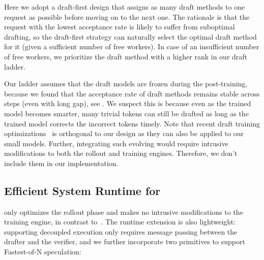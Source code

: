 Here we adopt a draft-first design that assigns as many draft methods to one request as possible before moving on to the next one.
The rationale is that the request with the lowest acceptance rate is likely to suffer from suboptimal drafting,
so the draft-first strategy can naturally select the optimal draft method for it (given a sufficient number of free workers).
In case of an insufficient number of free workers, we prioritize the draft method with a higher rank in our draft ladder.


Our ladder assumes that the draft models are frozen during the post-training, 
because we found that the acceptance rate of draft methods remains stable 
across steps (even with long gap), see {}. 
We suspect this is because even as the trained model becomes smarter,
many trivial tokens can still be drafted as long as the trained model corrects
the incorrect tokens timely. 
{Note that recent draft training optimizations~\cite{tlt} is orthogonal 
to our design as they can also be applied to our small models.}
Further, integrating such evolving would require
intrusive modifications to both the rollout and training engines.
Therefore, we don't include them in our implementation. 

\subsection{Efficient System Runtime for {\sys}}
\label{sec:design-mechanisms}

\noindent 
{\sys} only optimizes the rollout phase and makes no intrusive modifications
to the training engine, in contrast to~\cite{rlhfuse,rollpacker}.
The runtime extension is also lightweight:
supporting decoupled execution only requires message passing
between the drafter and the verifier,
and we further incorporate two primitives to support Fastest-of-N speculation:


